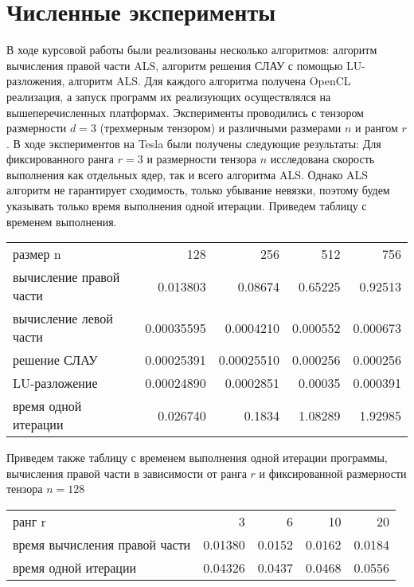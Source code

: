 \documentclass{scrartcl}
\begin{document}
\section{Численные эксперименты}
\label{sec-10}

В ходе курсовой работы были реализованы несколько алгоритмов: алгоритм вычисления правой
части ALS, алгоритм решения СЛАУ с помощью LU-разложения, алгоритм ALS. Для каждого 
алгоритма получена OpenCL реализация, а запуск программ их реализующих осуществлялся
на вышеперечисленных платформах. Эксперименты проводились с тензором размерности $d=3$
(трехмерным тензором) и различными размерами $n$ и рангом $r$.
 В ходе экспериментов на Tesla были получены следующие
результаты:
Для фиксированного ранга $r=3$ и размерности тензора $n$ исследована скорость выполнения как отдельных ядер, 
так и всего алгоритма ALS. Однако ALS алгоритм не гарантирует сходимость, только
убывание невязки, поэтому будем указывать только время выполнения одной итерации.
Приведем таблицу с временем выполнения.


\begin{center}
\begin{tabular}{lrrrr}
 размер n                 &         128  &         256  &       512  &       756  \\
 вычисление правой части  &    0.013803  &     0.08674  &   0.65225  &   0.92513  \\
 вычисление левой части   &  0.00035595  &   0.0004210  &  0.000552  &  0.000673  \\
 решение СЛАУ             &  0.00025391  &  0.00025510  &  0.000256  &  0.000256  \\
 LU-разложение            &  0.00024890  &   0.0002851  &   0.00035  &  0.000391  \\
 время одной итерации     &    0.026740  &      0.1834  &   1.08289  &   1.92985  \\
\end{tabular}
\end{center}



Приведем также таблицу с временем выполнения одной итерации программы, вычисления
правой части в зависимости от ранга $r$ и фиксированной размерности тензора $n=128$

\begin{center}
\begin{tabular}{lrrrr}
 ранг r                         &        3  &       6  &      10  &      20  \\
 время вычисления правой части  &  0.01380  &  0.0152  &  0.0162  &  0.0184  \\
 время одной итерации           &  0.04326  &  0.0437  &  0.0468  &  0.0556  \\
\end{tabular}
\end{center}
\end{document}
